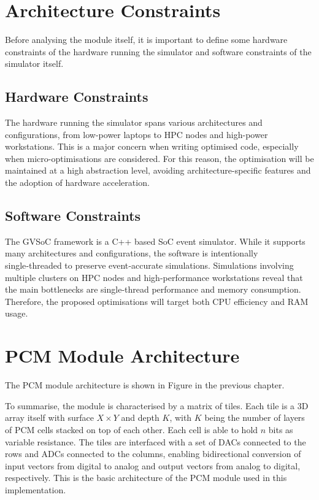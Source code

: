 \section{Architecture Constraints}\label{sec:arch_const}
Before analysing the module itself, it is important to define some hardware constraints of the hardware running the simulator and software constraints of the simulator itself.

\subsection{Hardware Constraints}\label{sec:hw_const}
The hardware running the simulator spans various architectures and configurations, from low-power laptops to HPC nodes and high-power workstations.
This is a major concern when writing optimised code, especially when micro-optimisations are considered.
For this reason, the optimisation will be maintained at a high abstraction level, avoiding architecture-specific features and the adoption of hardware acceleration.

\subsection{Software Constraints}\label{sec:sw_const}
The GVSoC framework is a C++ based SoC event simulator. While it supports many architectures and configurations, the software is intentionally single‑threaded to preserve event‑accurate simulations.
Simulations involving multiple clusters on HPC nodes and high‑performance workstations reveal that the main bottlenecks are single‑thread performance and memory consumption. Therefore, the proposed optimisations will target both CPU efficiency and RAM usage.

\section{PCM Module Architecture}\label{sec:module_arch}
The PCM module architecture is shown in Figure  in the previous chapter.

To summarise, the module is characterised by a matrix of tiles. Each tile is a 3D array itself with surface $X \times Y$ and depth $K$, with $K$ being the number of layers of PCM cells stacked on top of each other. Each cell is able to hold $n$ bits as variable resistance.
The tiles are interfaced with a set of DACs connected to the rows and ADCs connected to the columns, enabling bidirectional conversion of input vectors from digital to analog and output vectors from analog to digital, respectively.
This is the basic architecture of the PCM module used in this implementation.

